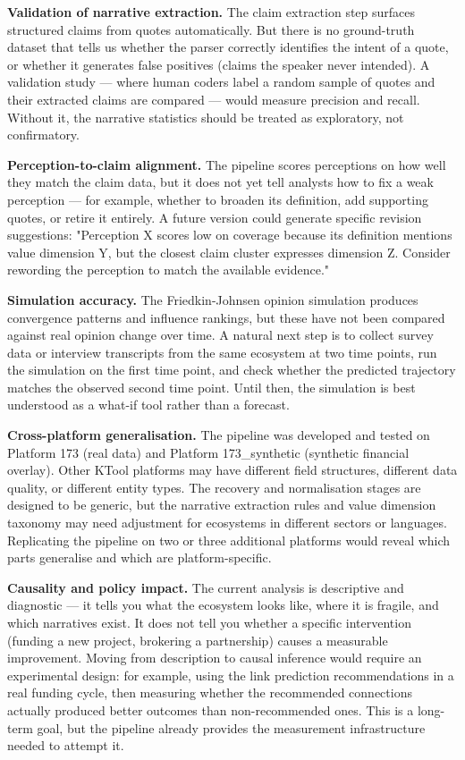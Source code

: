 \documentclass[11pt,a4paper]{article}
\begin{document}
\textbf{Validation of narrative extraction.} The claim extraction step
surfaces structured claims from quotes automatically. But there is no
ground-truth dataset that tells us whether the parser correctly
identifies the intent of a quote, or whether it generates false positives
(claims the speaker never intended). A validation study — where human
coders label a random sample of quotes and their extracted claims are
compared — would measure precision and recall. Without it, the narrative
statistics should be treated as exploratory, not confirmatory.

\textbf{Perception-to-claim alignment.} The pipeline scores perceptions on how
well they match the claim data, but it does not yet tell analysts how to
fix a weak perception — for example, whether to broaden its definition,
add supporting quotes, or retire it entirely. A future version could
generate specific revision suggestions: "Perception X scores low on
coverage because its definition mentions value dimension Y, but the
closest claim cluster expresses dimension Z. Consider rewording the
perception to match the available evidence."

\textbf{Simulation accuracy.} The Friedkin-Johnsen opinion simulation produces
convergence patterns and influence rankings, but these have not been
compared against real opinion change over time. A natural next step is
to collect survey data or interview transcripts from the same ecosystem
at two time points, run the simulation on the first time point, and
check whether the predicted trajectory matches the observed second time
point. Until then, the simulation is best understood as a what-if tool
rather than a forecast.

\textbf{Cross-platform generalisation.} The pipeline was developed and tested
on Platform 173 (real data) and Platform 173\_synthetic (synthetic
financial overlay). Other KTool platforms may have different field
structures, different data quality, or different entity types. The
recovery and normalisation stages are designed to be generic, but the
narrative extraction rules and value dimension taxonomy may need
adjustment for ecosystems in different sectors or languages. Replicating
the pipeline on two or three additional platforms would reveal which
parts generalise and which are platform-specific.

\textbf{Causality and policy impact.} The current analysis is descriptive and
diagnostic — it tells you what the ecosystem looks like, where it is
fragile, and which narratives exist. It does not tell you whether a
specific intervention (funding a new project, brokering a partnership)
causes a measurable improvement. Moving from description to causal
inference would require an experimental design: for example, using the
link prediction recommendations in a real funding cycle, then measuring
whether the recommended connections actually produced better outcomes
than non-recommended ones. This is a long-term goal, but the pipeline
already provides the measurement infrastructure needed to attempt it.
\end{document}
